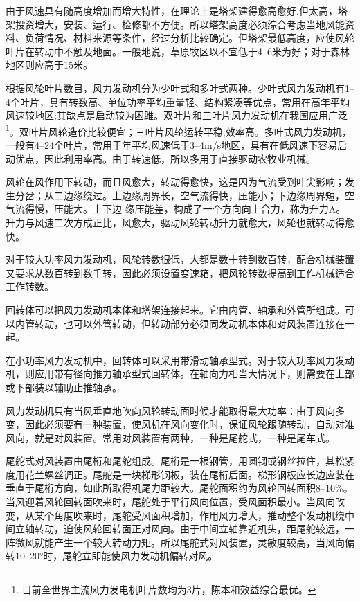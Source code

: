 \documentclass{ctexbook}
\begin{document}
由于风速具有随高度增加而增大特性，在理论上是塔架建得愈高愈好.但太高，塔架投资增大，安装、运行、检修都不方便。所以塔架高度必须综合考虑当地风能资料、负荷情况、材料来源等条件，经过分析比较确定。但塔架最低高度，应使风轮叶片在转动中不触及地面。一般地说，草原牧区以不宜低于4--6米为好；对于森林地区则应高于15米。

根据风轮叶片数目，风力发动机分为少叶式和多叶式两种。少叶式风力发动机有1--4个叶片，具有转数高、单位功率平均重量轻、结构紧凑等优点，常用在高年平均风速较地区;其缺点是启动较为困雎。双叶片和三叶片风力发动机在我国应用广泛\footnote{目前全世界主流风力发电机叶片数均为3片，陈本和效益综合最优。}。双叶片风轮造价比较便宜；三叶片风轮运转平稳;效率高。多叶式风力发动机，一般有4--24个叶片，常用于年平均风速低于3--4m/s地区，具有在低风速下容易启动优点，因此利用率高。由于转速低，所以多用于直接驱动农牧业机械。

风轮在风作用下转动，而且风愈大，转动得愈快，这是因为气流受到叶尖影响；发生分岔；从二边缘绕过。上边缘周界长，空气流得快，压能小；下边缘周界短，空气流得慢，压能大。上下边
缘压能差，构成了一个方向向上合力，称为升力A。升力与风速二次方成正比，风愈大，驱动风轮转动升力就愈大，风轮也就转动得愈快。

对于较大功率风力发动机，风轮转数很低，大都是数十转到数百转，配合机械装置又要求从数百转到数千转，因此必须设置变速箱，把风轮转数提高到工作机械适合工作转数。

回转体可以把风力发动机本体和塔架连接起来。它由内管、轴承和外管所组成。可以内管转动，也可以外管转动，但转动部分必须同发动机本体和对风装置连接在一起。

在小功率风力发动机中，回转体可以采用带滑动轴承型式。对于较大功率风力发动机，则应用带有径向推力轴承型式回转体。在轴向力相当大情况下，则需要在上部或下部装以辅助止推轴承。

风力发动机只有当风垂直地吹向风轮转动面时候才能取得最大功率：由于风向多变，因此必须要有一种装置，使风机在风向变化时，保证风轮跟随转动，自动对准风向，就是对风装置。常用对风装置有两种，一种是尾舵式，一种是尾车式。

尾舵式对风装置由尾桁和尾舵组成。尾桁是一根钢管，用圆钢或钢丝拉住，其松紧度用花兰螺丝调正。尾舵是一块梯形钢板，装在尾桁后面。梯形钢板应长边应装在垂直于尾桁方向，如此所取得机尾力距较大。尾舵面积约为风轮回转面积8--10\%。当风迎着风轮回转面吹来时，尾舵处于平行风向位置，受风面积最小。当风向改变，从某个角度吹来时，尾舵受风面积增加，作用风力增大，推动整个发动机绕中间立轴转动，迫使风轮回转面正对风向。由于中间立轴靠近机头，距尾舵较远，一阵微风就能产生一个较大转动力矩。所以尾舵式对风装置，灵敏度较高，当风向偏转10--20°时，尾舵立即能使风力发动机偏转对风。
\end{document}
